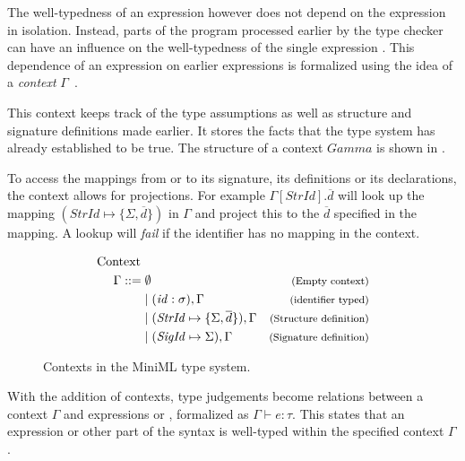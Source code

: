 The well-typedness of an expression  however does not depend on the expression  in isolation.
Instead, parts of the program processed earlier by the type checker can have an influence on the well-typedness of the single expression .
This dependence of an expression  on earlier expressions is formalized using the idea of a \emph{context} $\Gamma$~\cite{Pierce}. 

This context keeps track of the type assumptions as well as structure and signature definitions made earlier.
It stores the facts that the type system has already established to be true.
The structure of a context $Gamma$ is shown in .

To access the mappings from  or  to its signature, its definitions or its declarations, the context allows for projections. For example $\Gamma[\mathit{StrId}].\overline{d}$ will look up the mapping $(\mathit{StrId} \mapsto \lbrace \Sigma,\overline{d}\rbrace)$ in $\Gamma$ and project this to the $\overline{d}$ specified in the mapping. A lookup will \emph{fail} if the identifier has no mapping in the context.

\begin{figure}[!htb]
\begin{align*}
\begin{aligned}
\text{Context }\\
\Gamma ::=\; &\emptyset     & \footnotesize\text{(Empty context)}\\
&| \; (\mathit{id}:\sigma),\Gamma          & \footnotesize\text{(identifier typed)}\\
&| \; (\mathit{StrId} \mapsto \lbrace \Sigma,\overline{d}\rbrace), \Gamma 
                                           & \footnotesize\text{(Structure definition)}\\
&| \; (\mathit{SigId} \mapsto \Sigma), \Gamma
                                           & \footnotesize\text{(Signature definition)}
\end{aligned}
\end{align*}
\caption{Contexts in the MiniML type system.}
\label{fig:MiniMLContexts}
\end{figure}

With the addition of contexts, type judgements become relations between a context $\Gamma$ and expressions  or , formalized as $\Gamma \vdash e:\tau$.
This states that an expression or other part of the syntax is well-typed within the specified context $\Gamma$.

